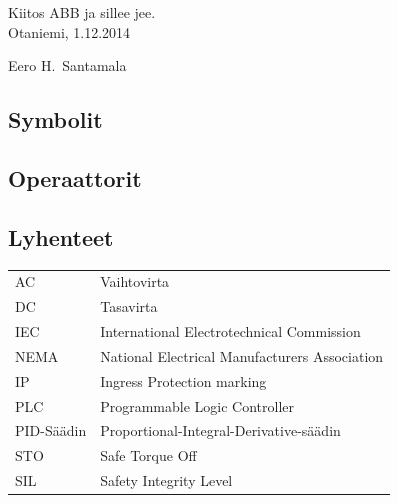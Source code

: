 \documentclass[finnish,12pt,a4paper,pdftex,elec,utf8]{aaltothesis}
\begin{document}

Kiitos ABB ja sillee jee.\\

\vspace{5cm}
Otaniemi, 1.12.2014

\vspace{5mm}
{\hfill Eero H.\ Santamala \hspace{1cm}}

\newpage


\thesistableofcontents



\subsection*{Symbolit}


\subsection*{Operaattorit}



\subsection*{Lyhenteet}

\begin{tabular}{ll}
AC         & Vaihtovirta \\
DC         & Tasavirta \\
IEC	       & International Electrotechnical Commission \\
NEMA       & National Electrical Manufacturers Association \\
IP		   & Ingress Protection marking \\
PLC		   & Programmable Logic Controller \\
PID-Säädin & Proportional-Integral-Derivative-säädin \\
STO		   & Safe Torque Off \\
SIL		   & Safety Integrity Level
\end{tabular}


\cleardoublepage
\storeinipagenumber
{}
\setcounter{page}{1}
\end{document}
